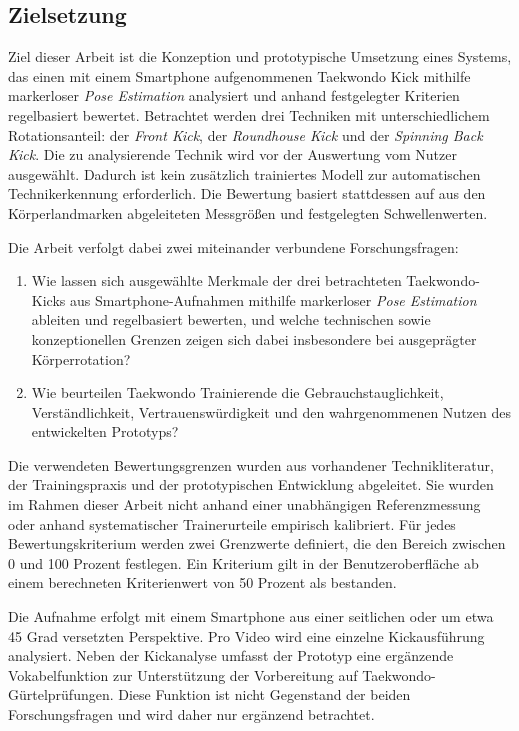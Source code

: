 \documentclass[intern]{cgMA}
\begin{document}
\subsection{Zielsetzung}
Ziel dieser Arbeit ist die Konzeption und prototypische Umsetzung eines Systems, das einen mit einem Smartphone aufgenommenen Taekwondo Kick mithilfe markerloser \textit{Pose Estimation} analysiert und anhand festgelegter Kriterien regelbasiert bewertet. Betrachtet werden drei Techniken mit unterschiedlichem Rotationsanteil: der \textit{Front Kick}, der \textit{Roundhouse Kick} und der \textit{Spinning Back Kick}. Die zu analysierende Technik wird vor der Auswertung vom Nutzer ausgewählt. Dadurch ist kein zusätzlich trainiertes Modell zur automatischen Technikerkennung erforderlich. Die Bewertung basiert stattdessen auf aus den Körperlandmarken abgeleiteten Messgrößen und festgelegten Schwellenwerten.

Die Arbeit verfolgt dabei zwei miteinander verbundene Forschungsfragen:

\begin{enumerate}
    \item Wie lassen sich ausgewählte Merkmale der drei betrachteten Taekwondo-Kicks aus Smartphone-Aufnahmen mithilfe markerloser \textit{Pose Estimation} ableiten und regelbasiert bewerten, und welche technischen sowie konzeptionellen Grenzen zeigen sich dabei insbesondere bei ausgeprägter Körperrotation?
    \item Wie beurteilen Taekwondo Trainierende die Gebrauchstauglichkeit, Verständlichkeit, Vertrauenswürdigkeit und den wahrgenommenen Nutzen des entwickelten Prototyps?
\end{enumerate}

Die verwendeten Bewertungsgrenzen wurden aus vorhandener Technikliteratur, der Trainingspraxis und der prototypischen Entwicklung abgeleitet. Sie wurden im Rahmen dieser Arbeit nicht anhand einer unabhängigen Referenzmessung oder anhand systematischer Trainerurteile empirisch kalibriert. Für jedes Bewertungskriterium werden zwei Grenzwerte definiert, die den Bereich zwischen 0 und 100 Prozent festlegen. Ein Kriterium gilt in der Benutzeroberfläche ab einem berechneten Kriterienwert von 50 Prozent als bestanden.

Die Aufnahme erfolgt mit einem Smartphone aus einer seitlichen oder um etwa 45 Grad versetzten Perspektive. Pro Video wird eine einzelne Kickausführung analysiert. Neben der Kickanalyse umfasst der Prototyp eine ergänzende Vokabelfunktion zur Unterstützung der Vorbereitung auf Taekwondo-Gürtelprüfungen. Diese Funktion ist nicht Gegenstand der beiden Forschungsfragen und wird daher nur ergänzend betrachtet.
\end{document}
